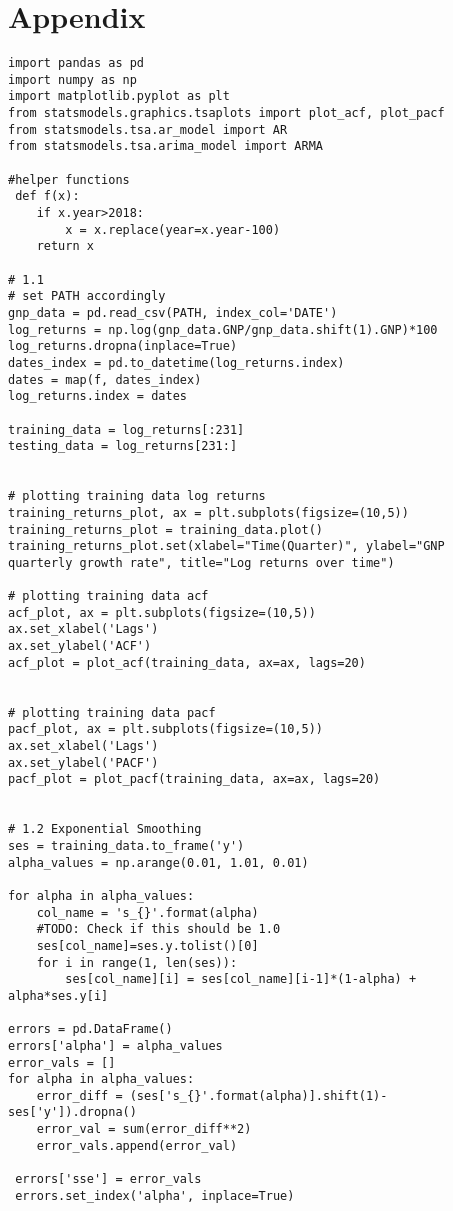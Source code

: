 \documentclass{article}
\begin{document}
\clearpage
\section{Appendix}
\begin{lstlisting}
import pandas as pd
import numpy as np
import matplotlib.pyplot as plt
from statsmodels.graphics.tsaplots import plot_acf, plot_pacf
from statsmodels.tsa.ar_model import AR
from statsmodels.tsa.arima_model import ARMA

#helper functions
 def f(x):            
	if x.year>2018:
		x = x.replace(year=x.year-100)
	return x

# 1.1
# set PATH accordingly
gnp_data = pd.read_csv(PATH, index_col='DATE')
log_returns = np.log(gnp_data.GNP/gnp_data.shift(1).GNP)*100
log_returns.dropna(inplace=True)
dates_index = pd.to_datetime(log_returns.index)
dates = map(f, dates_index)
log_returns.index = dates

training_data = log_returns[:231]
testing_data = log_returns[231:]


# plotting training data log returns
training_returns_plot, ax = plt.subplots(figsize=(10,5))
training_returns_plot = training_data.plot()
training_returns_plot.set(xlabel="Time(Quarter)", ylabel="GNP quarterly growth rate", title="Log returns over time")

# plotting training data acf
acf_plot, ax = plt.subplots(figsize=(10,5))
ax.set_xlabel('Lags')
ax.set_ylabel('ACF')
acf_plot = plot_acf(training_data, ax=ax, lags=20)


# plotting training data pacf
pacf_plot, ax = plt.subplots(figsize=(10,5))
ax.set_xlabel('Lags')
ax.set_ylabel('PACF')
pacf_plot = plot_pacf(training_data, ax=ax, lags=20)


# 1.2 Exponential Smoothing 
ses = training_data.to_frame('y')
alpha_values = np.arange(0.01, 1.01, 0.01)

for alpha in alpha_values:
	col_name = 's_{}'.format(alpha)
	#TODO: Check if this should be 1.0
	ses[col_name]=ses.y.tolist()[0]
	for i in range(1, len(ses)):
		ses[col_name][i] = ses[col_name][i-1]*(1-alpha) + alpha*ses.y[i]

errors = pd.DataFrame()
errors['alpha'] = alpha_values
error_vals = []
for alpha in alpha_values:    
	error_diff = (ses['s_{}'.format(alpha)].shift(1)-ses['y']).dropna()                  
	error_val = sum(error_diff**2)
	error_vals.append(error_val)

 errors['sse'] = error_vals
 errors.set_index('alpha', inplace=True)


\end{lstlisting}
\end{document}
